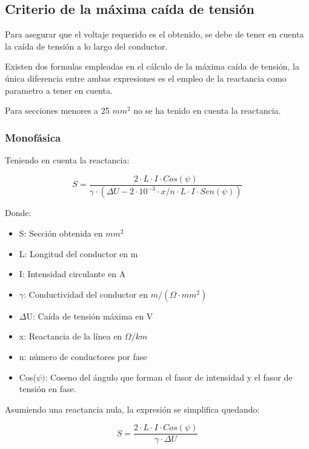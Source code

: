 \documentclass[../main.tex]{subfiles}
\begin{document}
\subsection{Criterio de la máxima caída de tensión}

Para asegurar que el voltaje requerido es el obtenido, se debe de tener en cuenta la caída de tensión a lo largo del conductor.

Existen dos formulas empleadas en el cálculo de la máxima caída de tensión, la única diferencia entre ambas expresiones es el empleo de la reactancia como parametro a tener en cuenta. 

Para secciones menores a 25 $mm^2$ no se ha tenido en cuenta la reactancia.

\subsubsection{Monofásica}

Teniendo en cuenta la reactancia:

\begin{equation}
    S = \frac{2\cdot L\cdot I\cdot Cos(\psi)}{\gamma\cdot (\Delta U-2\cdot 10^{-3} \cdot  x/n \cdot  L\cdot  I \cdot  Sen(\psi) )}
\end{equation}

Donde:
\begin{itemize}
    \item S: Sección obtenida en $mm^2$ 
    \item L: Longitud del conductor en m
    \item I: Intensidad circulante en A
    \item $\gamma$: Conductividad del conductor en $m/(\Omega\cdot mm^2)$
    \item $\Delta $U: Caída de tensión máxima en V
    \item x: Reactancia de la línea en $\Omega/km$
    \item n: número de conductores por fase
    \item Cos($\psi)$: Coseno del ángulo que forman el fasor de intensidad y el fasor de tensión en fase.
\end{itemize}

Asumiendo una reactancia nula, la expresión se simplifica quedando:

\begin{equation}
    S = \frac{2\cdot L\cdot I\cdot Cos(\psi)}{\gamma\cdot \Delta U}
\end{equation}
\end{document}
